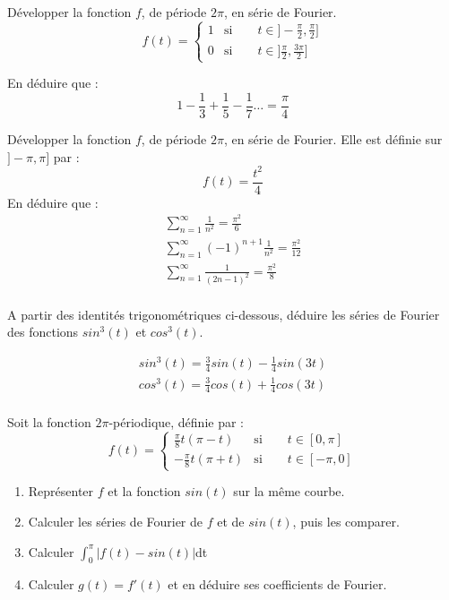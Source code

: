 \exercice
Développer la fonction $f$, de période $2\pi$, en série de Fourier.
\begin{equation*}
f(t)=
\begin{cases}
 1 & \text{si}\qquad t\in ]-\frac{\pi}{2},\frac{\pi}{2}] \\
 0 & \text{si}\qquad t\in ]\frac{\pi}{2},\frac{3\pi}{2}]
\end{cases}
\end{equation*} 

En déduire que :
\begin{equation*}
  1-\frac{1}{3}+\frac{1}{5}-\frac{1}{7}\dots=\frac{\pi}{4}
\end{equation*}

\exercice
Développer la fonction $f$, de période $2\pi$, en série de Fourier. Elle est définie sur $]-\pi,\pi]$ par :
\begin{equation*}
  f(t)=\frac{t^2}{4}
\end{equation*}
En déduire que :
\begin{eqnarray*}
  \sum_{n=1}^{\infty}\frac{1}{n^2}=\frac{\pi^2}{6} \\
 \sum_{n=1}^{\infty}(-1)^{n+1}\frac{1}{n^2}=\frac{\pi^2}{12} \\
 \sum_{n=1}^{\infty}\frac{1}{(2n-1)^2}=\frac{\pi^2}{8} \\
\end{eqnarray*}

\exercice
A partir des identités trigonométriques ci-dessous, déduire les séries de Fourier des fonctions $sin^3(t)$ et $cos^3(t)$.

\begin{eqnarray*}
  sin^3(t)=\frac{3}{4}sin(t)-\frac{1}{4}sin(3t) \\
 cos^3(t)=\frac{3}{4}cos(t)+\frac{1}{4}cos(3t) \\
\end{eqnarray*}

\exercice

Soit la fonction $2\pi$-périodique, définie par :
\begin{equation*}
f(t)=
\begin{cases}
 \frac{\pi}{8}t(\pi-t) & \text{si}\qquad t\in [0,\pi] \\
-\frac{\pi}{8}t(\pi+t) & \text{si}\qquad t\in [-\pi,0]
\end{cases}
\end{equation*} 
\begin{enumerate}
\item Représenter $f$ et la fonction $sin(t)$ sur la même courbe.
\item Calculer les séries de Fourier de $f$ et de $sin(t)$, puis les comparer.
\item Calculer $\int_0^{\pi}|f(t)-sin(t)|$dt
\item Calculer $g(t)=f'(t)$ et en déduire ses coefficients de Fourier.
\end{enumerate}


